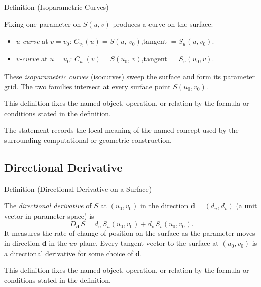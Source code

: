 \begin{definitionbox}{Definition (Isoparametric Curves)}
\begin{definition}
\label{def:isoparametric-curves}
Fixing one parameter on $S(u,v)$ produces a curve on the surface:
\begin{itemize}
  \item \emph{$u$-curve} at $v = v_0$:\quad
        $C_{v_0}(u) = S(u,\,v_0)$,\quad tangent $= S_u(u,v_0)$.
  \item \emph{$v$-curve} at $u = u_0$:\quad
        $C_{u_0}(v) = S(u_0,\,v)$,\quad tangent $= S_v(u_0,v)$.
\end{itemize}
These \emph{isoparametric curves} (isocurves) sweep the surface and
form its parameter grid.
The two families intersect at every surface point $S(u_0,v_0)$.
\end{definition}
\end{definitionbox}
\begin{remark*}
This definition fixes the named object, operation, or relation by the formula
or conditions stated in the definition.
\end{remark*}

\begin{remark*}[Interpretation]
The statement records the local meaning of the named concept used by the
surrounding computational or geometric construction.
\end{remark*}

\DefinitionalRoot

\subsection*{Directional Derivative}

\begin{definitionbox}{Definition (Directional Derivative on a Surface)}
\begin{definition}
\label{def:directional-derivative-surface}
The \emph{directional derivative} of $S$ at $(u_0,v_0)$ in the
direction $\mathbf{d} = (d_u, d_v)$ (a unit vector in parameter space) is
\[
  D_{\mathbf{d}}\,S = d_u\,S_u(u_0,v_0) + d_v\,S_v(u_0,v_0).
\]
It measures the rate of change of position on the surface as the
parameter moves in direction $\mathbf{d}$ in the $uv$-plane.
Every tangent vector to the surface at $(u_0,v_0)$ is a directional
derivative for some choice of $\mathbf{d}$.
\end{definition}
\end{definitionbox}
\begin{remark*}
This definition fixes the named object, operation, or relation by the formula
or conditions stated in the definition.
\end{remark*}


